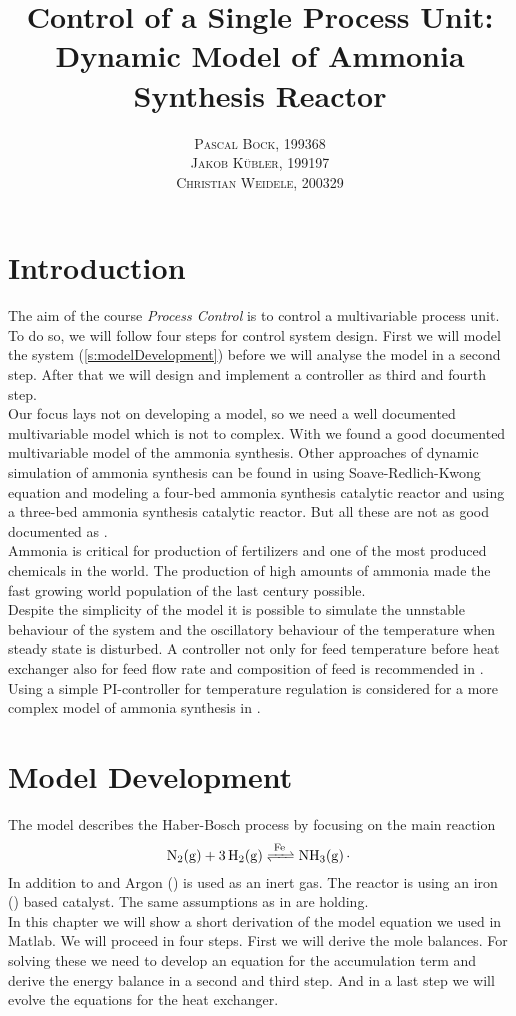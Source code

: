 \documentclass[paper=letter, fontsize=12pt]{article}
\title{\vspace{-15mm}\fontsize{24pt}{10pt}\selectfont\textbf{Control of a Single Process Unit: Dynamic Model of Ammonia Synthesis Reactor}} %
\author{
\large
{\textsc{Pascal Bock, 199368 }}\\[2mm]
{\textsc{Jakob Kübler, 199197 }}\\[2mm]
{\textsc{Christian Weidele,  200329}}\\[2mm]
}
\date{}
\newcommand\reaction[1]{\begin{equation}\ce{#1}\end{equation}}
\begin{document}
\maketitle %
\thispagestyle{fancy} %


\section{Introduction}
The aim of the course \emph{Process Control} is to control a multivariable process unit. To do so, we will follow four steps for control system design. First we will model the system (\autoref{s:modelDevelopment}) before we will analyse the model in a second step. After that we will design and implement a controller as third and fourth step. \\
Our focus lays not on developing a model, so we need a well documented multivariable model which is not to complex. With \cite{Jinasena2016} we found a good documented multivariable model of the ammonia synthesis. Other approaches of dynamic simulation of ammonia synthesis can be found in \cite{Kasiri2003} using Soave-Redlich-Kwong equation and modeling a four-bed ammonia synthesis catalytic reactor and \cite{Mancusi2009} using a three-bed ammonia synthesis catalytic reactor. But all these are not as good documented as \cite{Jinasena2016}.\\
Ammonia is critical for production of fertilizers and one of the most produced chemicals in the world. The production of high amounts of ammonia made the fast growing world population of the last century possible. \cite{Pattabathula2016} \\
Despite the simplicity of the model it is possible to simulate the unnstable behaviour of the system and the oscillatory behaviour of the temperature when steady state is disturbed. A controller not only for feed temperature before heat exchanger also for feed flow rate and composition of feed is recommended in \cite{Jinasena2016}. Using a simple PI-controller for temperature regulation is considered for a more complex model of ammonia synthesis in \cite{Morud1998}.


\section{Model Development} \label{s:modelDevelopment}

The model describes the Haber-Bosch process by focusing on the main reaction
\reaction{N2(g) + 3H2(g) <=>[Fe] NH3(g).} \label{f:reaction}
In addition to  and  Argon () is used as an inert gas. The reactor is using an iron () based catalyst. The same assumptions as in \cite{Jinasena2016} are holding.\\
In this chapter we will show a short derivation of the model equation we used in Matlab. We will proceed in four steps. First we will derive the mole balances. For solving these we need to develop an equation for the accumulation term and derive the energy balance in a second and third step. And in a last step we will evolve the equations for the heat exchanger.
\end{document}
